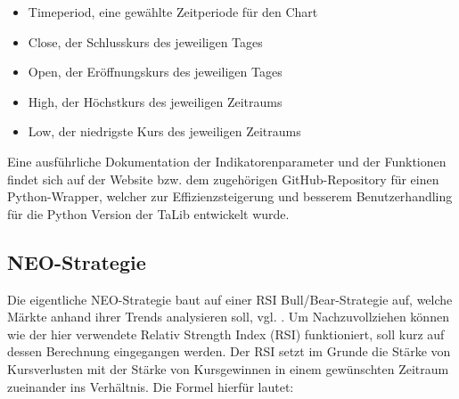 \begin{itemize}
	\item Timeperiod, eine gewählte Zeitperiode für den Chart
	\item Close, der Schlusskurs des jeweiligen Tages
	\item Open, der Eröffnungskurs des jeweiligen Tages
	\item High, der Höchstkurs des jeweiligen Zeitraums
	\item Low, der niedrigste Kurs des jeweiligen Zeitraums
\end{itemize}

Eine ausführliche Dokumentation der Indikatorenparameter und der Funktionen findet sich auf der Website bzw. dem zugehörigen GitHub-Repository \cite{mrj20} für einen Python-Wrapper, welcher zur Effizienzsteigerung und besserem Benutzerhandling für die Python Version der TaLib entwickelt wurde.

\subsection{NEO-Strategie}
\label{sec:neo-strategie}

Die eigentliche NEO-Strategie baut auf einer RSI Bull/Bear-Strategie auf, welche Märkte anhand ihrer Trends analysieren soll, vgl. \cite{pro19} . Um Nachzuvollziehen können wie der hier verwendete Relativ Strength Index (RSI) funktioniert, soll kurz auf dessen Berechnung eingegangen werden. Der RSI setzt im Grunde die Stärke von Kursverlusten mit der Stärke von Kursgewinnen in einem gewünschten Zeitraum zueinander ins Verhältnis. Die Formel hierfür lautet: \\ 

 \\

